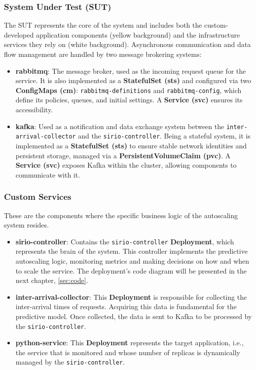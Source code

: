 \subsubsection{System Under Test (SUT)}
The SUT represents the core of the system and includes both the custom-developed application components (yellow background) and the infrastructure services they rely on (white background).
Asynchronous communication and data flow management are handled by two message brokering systems:
\begin{itemize}
\item \textbf{rabbitmq}: The message broker, used as the incoming request queue for the service. It is also implemented as a \textbf{StatefulSet (sts)} and configured via two \textbf{ConfigMaps (cm)}: \verb|rabbitmq-definitions| and \verb|rabbitmq-config|, which define its policies, queues, and initial settings. A \textbf{Service (svc)} ensures its accessibility.
    \item \textbf{kafka}: Used as a notification and data exchange system between the \verb|inter-arrival-collector| and the \verb|sirio-controller|. Being a stateful system, it is implemented as a \textbf{StatefulSet (sts)} to ensure stable network identities and persistent storage, managed via a \textbf{PersistentVolumeClaim (pvc)}. A \textbf{Service (svc)} exposes Kafka within the cluster, allowing components to communicate with it.

\end{itemize}

\subsubsection{Custom Services}
These are the components where the specific business logic of the autoscaling system resides.
\begin{itemize}
    \item \textbf{sirio-controller}: Contains the \verb|sirio-controller| \textbf{Deployment}, which represents the brain of the system. This controller implements the predictive autoscaling logic, monitoring metrics and making decisions on how and when to scale the service. The deployment's code diagram will be presented in the next chapter, \ref{sec:code}.
    \item \textbf{inter-arrival-collector}: This \textbf{Deployment} is responsible for collecting the inter-arrival times of requests. Acquiring this data is fundamental for the predictive model. Once collected, the data is sent to Kafka to be processed by the \verb|sirio-controller|.
    \item \textbf{python-service}: This \textbf{Deployment} represents the target application, i.e., the service that is monitored and whose number of replicas is dynamically managed by the \verb|sirio-controller|.
\end{itemize}

